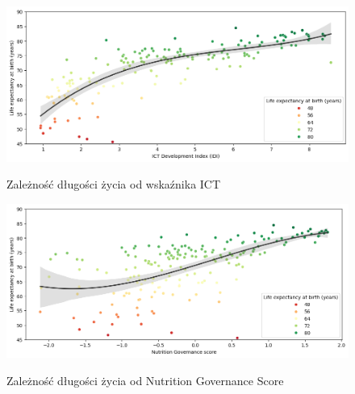 \documentclass{article}
\begin{document}
\begin{enumerate}
    \begin{figure}[H]
        \begin{minipage}[t]{0.48\textwidth}
            \label{fig:ict}
            \includegraphics[width=\textwidth]{graphs/ict.png}
            \caption{Zależność długości życia od wskaźnika ICT}
            \centering
        \end{minipage}
        \hfill
        \begin{minipage}[t]{0.48\textwidth}
            \label{fig:nutrition}
            \includegraphics[width=\textwidth]{graphs/ngs.png}
            \caption{Zależność długości życia od Nutrition Governance Score}
            \centering
        \end{minipage}
    \end{figure}


\end{enumerate}
\end{document}
